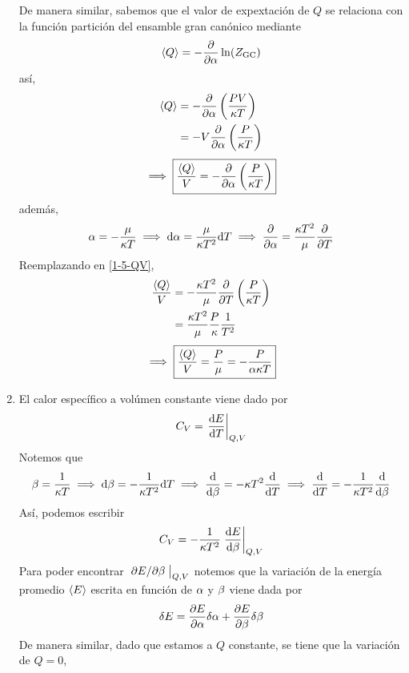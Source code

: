 \begin{sol}
\begin{enumerate}
De manera similar, sabemos que el valor de expextación de $Q$ se relaciona con la función partición del ensamble gran canónico mediante
\begin{equation}
  \ev{Q}=-\pdv{\a }\ln(\zgc )
\end{equation}
así,
\begin{align}
  \ev{Q}&=-\pdv{\a}\left(\frac{PV}{\k T}\right)\\
  &=-V\pdv{\a}\left(\frac{P}{\k T}\right)
\end{align}
\begin{equation}\label{1-5-QV}
  \implies \boxed{\frac{\ev{Q}}{V}=-\pdv{\a}\left(\frac{P}{\k T}\right)}
\end{equation}
además,
\begin{equation}
  \alpha=-\frac{\mu }{\kappa T}\implies \dd\alpha =\frac{\mu }{\kappa T^2}\dd T\implies \pdv{\alpha}=\frac{\kappa T^2}{\mu }\pdv{T}
\end{equation}
Reemplazando en \eqref{1-5-QV},
\begin{align}
  \frac{\ev{Q}}{V}&=-\frac{\k T^2}{\m }\pdv{T}\left(\frac{P}{\k T}\right)\\
  &=\frac{\k T^2}{\m }\frac{P }{\k }\frac{1}{T^2}
\end{align}
\begin{equation}
  \implies\boxed{ \frac{\ev{Q}}{V}=\frac{P}{\m }=-\frac{P}{\a\k T}}
\end{equation}
\item 
El calor específico a volúmen constante viene dado por
\begin{equation}
  C_V=\eval{\dv{E}{T}}_{Q,V}
\end{equation}
Notemos que
\begin{equation}
  \beta=\frac{1}{\kappa T}\implies \dd\beta=-\frac{1}{\kappa T^2}\dd T\implies \dv{\beta}=-\kappa T^2\dv{T}\implies \dv{T}=-\frac{1}{\kappa T^2}\dv{\beta}
\end{equation}
Así, podemos escribir
\begin{equation}\label{1-5-CV}
  C_V=-\frac{1}{\k T^2}\eval{\dv{E}{\b }}_{Q,V}
\end{equation}
Para poder encontrar $\eval{\pdv*{E}{\b }}_{Q,V}$ notemos que la variación de la energía promedio $\ev{E}$ escrita en función de $\alpha$ y $\beta$ viene dada por
\begin{equation}\label{1-5-dE}
  \delta E=\pdv{E}{\alpha}\delta \alpha +\pdv{E}{\beta}\delta \beta 
\end{equation}
De manera similar, dado que estamos a $Q$ constante, se tiene que la variación de $Q=0$,
\begin{equation}

\end{equation}
\end{enumerate}
\end{sol}
